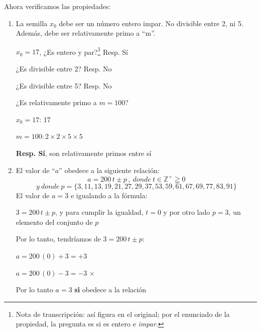 \documentclass[11pt,letterpaper]{report}
\begin{document}
Ahora verificamos las propiedades:
\begin{enumerate}[label=\roman*)]
\item La semilla $x_0$ debe ser un número entero impar. No divisible entre 2, ni 5. Además, debe ser relativamente primo a ``m''.

$x_0 = 17$, ¿Es entero y par?\footnote{Nota de transcripción: así figura en el original; por el enunciado de la propiedad, la pregunta es si es entero e \emph{impar}.} Resp. Sí

¿Es divisible entre 2? Resp. No

¿Es divisible entre 5? Resp. No

¿Es relativamente primo a $m = 100$?

$x_0 = 17$: 17

$m = 100 : 2 \times 2 \times 5 \times 5$

\textbf{Resp. Sí}, son relativamente primos entre sí

\begin{center}
\end{center}

\item El valor de ``$a$'' obedece a la siguiente relación:
\[
a = 200\,t \pm p\,,\ donde\ t \in \mathbb{Z}^+ \geqq 0
\]
\[
y\ donde\ p = \{3,11,13,19,21,27,29,37,53,59,61,67,69,77,83,91\}
\]
El valor de $a = 3$ e igualando a la fórmula:

$3 = 200\,t \pm p$, y para cumplir la igualdad, $t = 0$ y por otro lado $p = 3$, un elemento del conjunto de $p$

Por lo tanto, tendríamos de $3 = 200\,t \pm p$:

$a = 200\,(0) + 3 = +3$ \checkmark

$a = 200\,(0) - 3 = -3$ $\times$

\begin{center}
\end{center}

Por lo tanto $a = 3$ \textbf{si} obedece a la relación


\end{enumerate}
\end{document}
